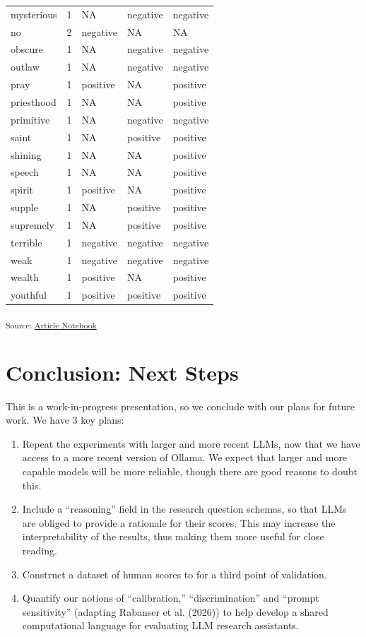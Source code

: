 \documentclass[
  letterpaper,
  DIV=11,
  numbers=noendperiod]{scrartcl}
\providecommand{\tightlist}{%
  \setlength{\itemsep}{0pt}\setlength{\parskip}{0pt}}
\begin{document}
\begin{longtable}[]{@{}lrlll@{}}
mysterious & 1 & NA & negative & negative \\
no & 2 & negative & NA & NA \\
obscure & 1 & NA & negative & negative \\
outlaw & 1 & NA & negative & negative \\
pray & 1 & positive & NA & positive \\
priesthood & 1 & NA & NA & positive \\
primitive & 1 & NA & negative & negative \\
saint & 1 & NA & positive & positive \\
shining & 1 & NA & NA & positive \\
speech & 1 & NA & NA & positive \\
spirit & 1 & positive & NA & positive \\
supple & 1 & NA & positive & positive \\
supremely & 1 & NA & positive & positive \\
terrible & 1 & negative & negative & negative \\
weak & 1 & negative & negative & negative \\
wealth & 1 & positive & NA & positive \\
youthful & 1 & positive & positive & positive \\

\end{longtable}

\textsubscript{Source:
\href{https://uom-digital-studies.github.io/aeolus-microtexts/index.qmd.html}{Article
Notebook}}

\section{Conclusion: Next Steps}\label{conclusion-next-steps}

This is a work-in-progress presentation, so we conclude with our plans
for future work. We have 3 key plans:

\begin{enumerate}
\def\labelenumi{\arabic{enumi}.}
\tightlist
\item
  Repeat the experiments with larger and more recent LLMs, now that we
  have access to a more recent version of Ollama. We expect that larger
  and more capable models will be more reliable, though there are good
  reasons to doubt this.
\item
  Include a ``reasoning'' field in the research question schemas, so
  that LLMs are obliged to provide a rationale for their scores. This
  may increase the interpretability of the results, thus making them
  more useful for close reading.
\item
  Construct a dataset of human scores to for a third point of
  validation.
\item
  Quantify our notions of ``calibration,'' ``discrimination'' and
  ``prompt sensitivity'' (adapting Rabanser et al. (2026)) to help
  develop a shared computational language for evaluating LLM research
  assistants.
\end{enumerate}
\end{document}
